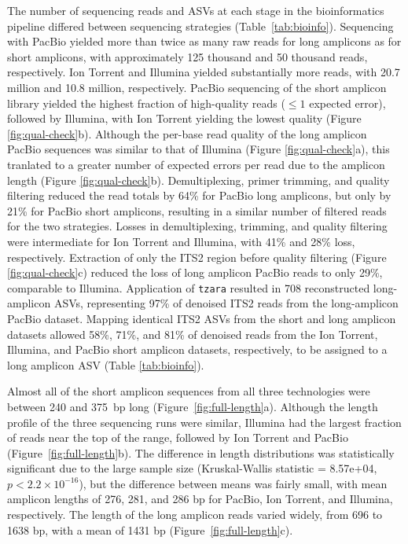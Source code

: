 \documentclass[
  12pt,
]{article}
\begin{document}
The number of sequencing reads and ASVs at each stage in the bioinformatics pipeline differed between sequencing strategies (Table~\ref{tab:bioinfo}).
Sequencing with PacBio yielded more than twice as many raw reads for long amplicons as for short amplicons, with approximately 125 thousand and 50 thousand reads, respectively.
Ion Torrent and Illumina yielded substantially more reads, with 20.7 million and 10.8 million, respectively.
PacBio sequencing of the short amplicon library yielded the highest fraction of high-quality reads (\(\le 1\) expected error), followed by Illumina, with Ion Torrent yielding the lowest quality (Figure \ref{fig:qual-check}b).
Although the per-base read quality of the long amplicon PacBio sequences was similar to that of Illumina (Figure \ref{fig:qual-check}a), this tranlated to a greater number of expected errors per read due to the amplicon length (Figure \ref{fig:qual-check}b).
Demultiplexing, primer trimming, and quality filtering reduced the read totals by 64\% for PacBio long amplicons, but only by 21\% for PacBio short amplicons, resulting in a similar number of filtered reads for the two strategies.
Losses in demultiplexing, trimming, and quality filtering were intermediate for Ion Torrent and Illumina, with 41\% and 28\% loss, respectively.
Extraction of only the ITS2 region before quality filtering (Figure \ref{fig:qual-check}c) reduced the loss of long amplicon PacBio reads to only 29\%, comparable to Illumina.
Application of \texttt{tzara} resulted in 708 reconstructed long-amplicon ASVs, representing 97\% of denoised ITS2 reads from the long-amplicon PacBio dataset.
Mapping identical ITS2 ASVs from the short and long amplicon datasets allowed 58\%, 71\%, and 81\% of denoised reads from the Ion Torrent, Illumina, and PacBio short amplicon datasets, respectively, to be assigned to a long amplicon ASV (Table \ref{tab:bioinfo}).

Almost all of the short amplicon sequences from all three technologies were between 240 and 375~bp long (Figure~\ref{fig:full-length}a).
Although the length profile of the three sequencing runs were similar, Illumina had the largest fraction of reads near the top of the range, followed by Ion Torrent and PacBio (Figure~\ref{fig:full-length}b).
The difference in length distributions was statistically significant due to the large sample size (Kruskal-Wallis statistic = 8.57e+04, \(p < 2.2\times10^{-16}\)),
but the difference between means was fairly small, with mean amplicon lengths of 276, 281, and 286 bp for PacBio, Ion Torrent, and Illumina, respectively.
The length of the long amplicon reads varied widely, from 696 to 1638 bp, with a mean of 1431 bp (Figure~\ref{fig:full-length}c).
\end{document}
